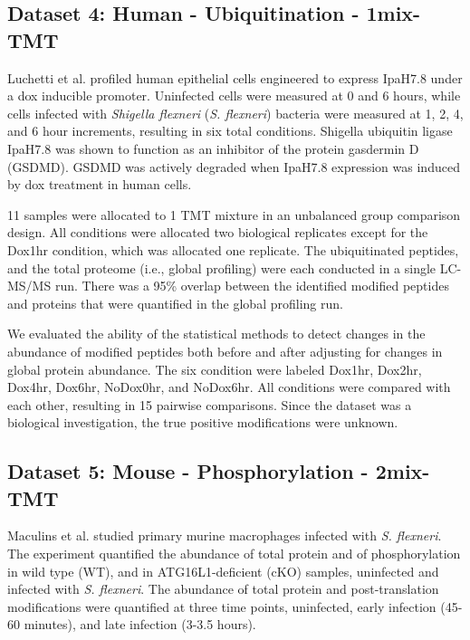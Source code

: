 \documentclass[mcp]{article}
\numberwithin{table}{section}
\begin{document}
\subsection*{Dataset 4: Human - Ubiquitination - 1mix-TMT}
\label{sec:exp_proc_dataset4}

\medskip {}  Luchetti et al. \cite{LUCHETTI2021} profiled human epithelial cells engineered to express IpaH7.8 under a dox inducible promoter. Uninfected cells were measured at 0 and 6 hours, while cells infected with {\it Shigella flexneri} ({\it S. flexneri}) bacteria were measured at 1, 2, 4, and 6 hour increments, resulting in six total conditions. Shigella ubiquitin ligase IpaH7.8 was shown to function as an inhibitor of the protein gasdermin D (GSDMD). GSDMD was actively degraded when IpaH7.8 expression was induced by dox treatment in human cells.

\medskip {} 11 samples were allocated to 1 TMT mixture in an unbalanced group comparison design. All conditions were allocated two biological replicates except for the Dox1hr condition, which was allocated one replicate. The ubiquitinated peptides, and the total proteome (i.e., global profiling) were each conducted in a single LC-MS/MS run. There was a 95\% overlap between the identified modified peptides and proteins that were quantified in the global profiling run.

\medskip {} We evaluated the ability of the statistical methods to detect changes in the abundance of modified peptides both before and after adjusting for changes in global protein abundance. The six condition were labeled Dox1hr, Dox2hr, Dox4hr, Dox6hr, NoDox0hr, and NoDox6hr. All conditions were compared with each other, resulting in 15 pairwise comparisons. Since the dataset was a biological investigation, the true positive modifications were unknown.


\subsection*{Dataset 5: Mouse - Phosphorylation - 2mix-TMT}
\label{sec:exp_proc_dataset5}


\medskip {} Maculins et al. \cite{Maculins} studied primary murine macrophages infected with {\it S. flexneri}. The experiment quantified the abundance of total protein and of phosphorylation in wild type (WT), and in ATG16L1-deficient (cKO) samples, uninfected and infected with {\it S. flexneri}. The abundance of total protein and post-translation modifications were quantified at three time points, uninfected, early infection (45-60 minutes), and late infection (3-3.5 hours). 
\end{document}
